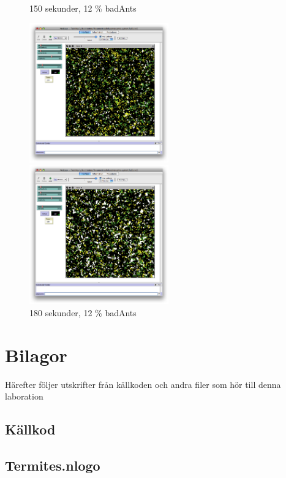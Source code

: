 \documentclass[titlepage, a4paper, 12pt]{article}
\begin{document}
\begin{figure}
  \begin{minipage}[b]{0.5\linewidth} %
    \centering
    \caption{150 sekunder, 12 \% badAnts}
    \includegraphics[width=6cm]{images/60-bad-150.png}
  \end{minipage}
  \hspace{0.5cm} %
  \begin{minipage}[b]{0.5\linewidth}
    \centering
    \caption{180 sekunder, 12 \% badAnts}
    \includegraphics[width=6cm]{images/60-bad-180.png}
  \end{minipage}
\end{figure}




\newpage
\appendix
{}
\section{Bilagor}\label{sec:kallkod}
Härefter följer utskrifter från källkoden och andra filer som hör till
denna laboration

\subsection{Källkod}
\subsection{Termites.nlogo}\label{Termites.nlogo}
\begin{footnotesize}
  
\end{footnotesize}
\end{document}

